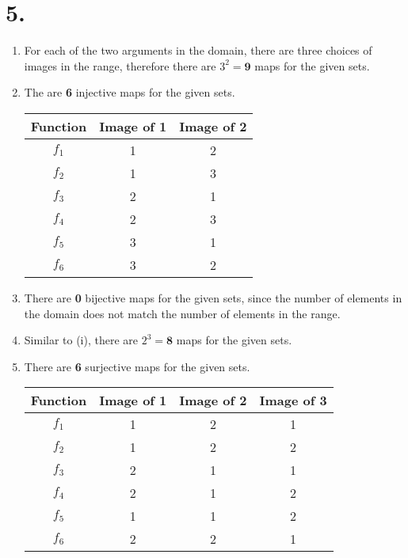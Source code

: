 \documentclass[12pt]{article}
\newcommand{\p}[1]{\item[\textnormal{(#1)}]}
\newenvironment{ps}
{\begin{enumerate}[leftmargin=0em, itemindent=1.5em]}
{\end{enumerate}}
\begin{document}
\section*{5.}
\begin{ps}

    \p{i} For each of the two arguments in the domain, there are three choices of images in the
    range, therefore there are \( 3^2 = \mathbf{9} \) maps for the given sets.

    \p{ii} The are \textbf{6} injective maps for the given sets.
        \begin{center}
        \begin{tabular}{|c|c|c|}
        \hline
        Function & Image of 1 & Image of 2 \\
        \hline
        $f_1$ & 1 & 2 \\
        $f_2$ & 1 & 3 \\
        $f_3$ & 2 & 1 \\
        $f_4$ & 2 & 3 \\
        $f_5$ & 3 & 1 \\
        $f_6$ & 3 & 2 \\
        \hline
        \end{tabular}
        \end{center}

    \p{iii} There are \textbf{0} bijective maps for the given sets, since the number of elements in
    the domain does not match the number of elements in the range.

    \p{iv} Similar to (i), there are \( 2^3 = \textbf{8} \) maps for the given sets. 

    \p{v} There are \textbf{6} surjective maps for the given sets.

        \begin{center}
        \begin{tabular}{|c|c|c|c|}
        \hline
        Function & Image of 1 & Image of 2 & Image of 3 \\
        \hline
        $f_1$ & 1 & 2 & 1 \\
        $f_2$ & 1 & 2 & 2 \\
        $f_3$ & 2 & 1 & 1 \\
        $f_4$ & 2 & 1 & 2 \\
        $f_5$ & 1 & 1 & 2 \\
        $f_6$ & 2 & 2 & 1 \\
        \hline
        \end{tabular}
        \end{center}

\end{ps}
\end{document}
